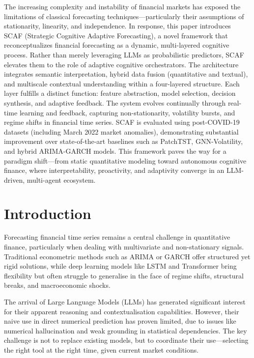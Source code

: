 \documentclass[conference]{IEEEtran}
\begin{document}
The increasing complexity and instability of financial markets has exposed the limitations of classical forecasting techniques—particularly their assumptions of stationarity, linearity, and independence. In response, this paper introduces SCAF (Strategic Cognitive Adaptive Forecasting), a novel framework that reconceptualizes financial forecasting as a dynamic, multi-layered cognitive process. Rather than merely leveraging LLMs as probabilistic predictors, SCAF elevates them to the role of adaptive cognitive orchestrators. The architecture integrates semantic interpretation, hybrid data fusion (quantitative and textual), and multiscale contextual understanding within a four-layered structure. Each layer fulfills a distinct function: feature abstraction, model selection, decision synthesis, and adaptive feedback. The system evolves continually through real-time learning and feedback, capturing non-stationarity, volatility bursts, and regime shifts in financial time series. SCAF is evaluated using post-COVID-19 datasets (including March 2022 market anomalies), demonstrating substantial improvement over state-of-the-art baselines such as PatchTST, GNN-Volatility, and hybrid ARIMA-GARCH models. This framework paves the way for a paradigm shift—from static quantitative modeling toward autonomous cognitive finance, where interpretability, proactivity, and adaptivity converge in an LLM-driven, multi-agent ecosystem.

\section{Introduction}
Forecasting financial time series remains a central challenge in quantitative finance, particularly when dealing with multivariate and non-stationary signals. Traditional econometric methods such as ARIMA or GARCH offer structured yet rigid solutions, while deep learning models like LSTM and Transformer bring flexibility but often struggle to generalise in the face of regime shifts, structural breaks, and macroeconomic shocks.

The arrival of Large Language Models (LLMs) has generated significant interest for their apparent reasoning and contextualisation capabilities. However, their naive use in direct numerical prediction has proven limited, due to issues like numerical hallucination and weak grounding in statistical dependencies. The key challenge is not to replace existing models, but to coordinate their use—selecting the right tool at the right time, given current market conditions.
\end{document}
